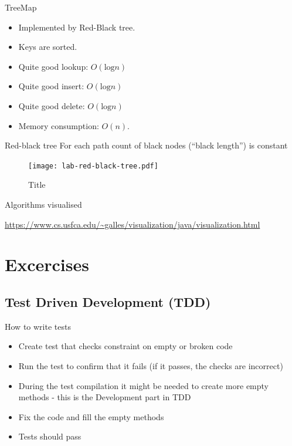 \documentclass{beamer}
\begin{document}
\begin{frame}{TreeMap}

\begin{itemize}
	\item Implemented by Red-Black tree.
    \item Keys are sorted.
    \item Quite good lookup: $O(\textrm{log}n)$
    \item Quite good insert: $O(\textrm{log}n)$
    \item Quite good delete: $O(\textrm{log}n)$
    \item Memory consumption: $O(n)$.
\end{itemize}
\end{frame}


\begin{frame}{Red-black tree}
    For each path count of black nodes (``black length'') is constant
    \begin{figure}[htbp]
    \centering
        \texttt{[image: lab-red-black-tree.pdf]}
    \caption{Title}
    \label{fig:lab_red_black_tree}
    \end{figure}

\end{frame}

\begin{frame}{Algorithms visualised}
\begin{center}
    \url{https://www.cs.usfca.edu/~galles/visualization/java/visualization.html}
\end{center}
\end{frame}

\section{Excercises}
\subsection{Test Driven Development (TDD)}
\begin{frame}{How to write tests}
    \begin{itemize}
        \item Create test that checks constraint on empty or broken code
        \item Run the test to confirm that it fails (if it passes, the checks are incorrect)
        \item During the test compilation it might be needed to create more empty methods - this is the Development part in TDD
        \item Fix the code and fill the empty methods
        \item Tests should pass
    \end{itemize}
\end{frame}
\end{document}
